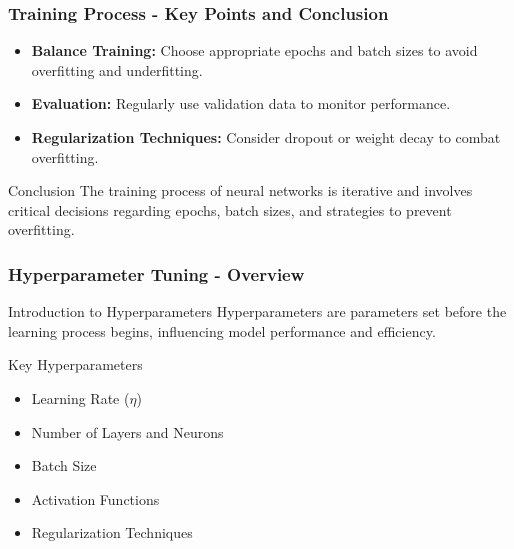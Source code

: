 \documentclass[aspectratio=169]{beamer}
\begin{document}
\begin{frame}[fragile]
    \frametitle{Training Process - Key Points and Conclusion}
    \begin{itemize}
        \item \textbf{Balance Training:} Choose appropriate epochs and batch sizes to avoid overfitting and underfitting.
        \item \textbf{Evaluation:} Regularly use validation data to monitor performance.
        \item \textbf{Regularization Techniques:} Consider dropout or weight decay to combat overfitting.
    \end{itemize}

    \begin{block}{Conclusion}
        The training process of neural networks is iterative and involves critical decisions regarding epochs, batch sizes, and strategies to prevent overfitting.
    \end{block}
\end{frame}

\begin{frame}
  \frametitle{Hyperparameter Tuning - Overview}
  \begin{block}{Introduction to Hyperparameters}
    Hyperparameters are parameters set before the learning process begins, influencing model performance and efficiency.
  \end{block}
  
  \begin{block}{Key Hyperparameters}
    \begin{itemize}
      \item Learning Rate ($\eta$)
      \item Number of Layers and Neurons
      \item Batch Size
      \item Activation Functions
      \item Regularization Techniques
    \end{itemize}
  \end{block}
\end{frame}
\end{document}
